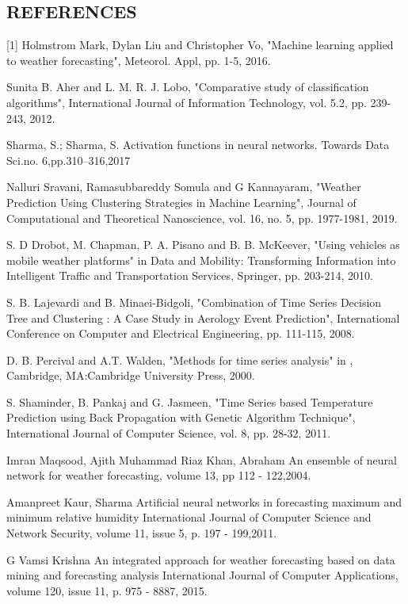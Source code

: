 \begin{}
    \section*{\centering REFERENCES}
    [1] Holmstrom Mark, Dylan Liu and Christopher Vo, "Machine learning applied to weather forecasting", Meteorol. Appl, pp. 1-5, 2016.


\noindent[2] Sunita B. Aher and L. M. R. J. Lobo, "Comparative study of classification algorithms", International Journal of Information Technology, vol. 5.2, pp. 239-243, 2012.

\noindent[3] Sharma, S.; Sharma, S. Activation functions in neural networks. Towards Data Sci.no. 6,pp.310–316,2017


\noindent[4] Nalluri Sravani, Ramasubbareddy Somula and G Kannayaram, "Weather Prediction Using Clustering Strategies in Machine Learning", Journal of Computational and Theoretical Nanoscience, vol. 16, no. 5, pp. 1977-1981, 2019.

\noindent[5] S. D Drobot, M. Chapman, P. A. Pisano and B. B. McKeever, "Using vehicles as mobile weather platforms" in Data and Mobility: Transforming Information into Intelligent Traffic and Transportation Services, Springer, pp. 203-214, 2010.

\noindent [6]S. B. Lajevardi and B. Minaei-Bidgoli, "Combination of Time Series Decision Tree and Clustering : A Case Study in Aerology Event Prediction", International Conference on Computer and Electrical Engineering, pp. 111-115, 2008.

\noindent[7] D. B. Percival and A.T. Walden, "Methods for time series analysis" in , Cambridge, MA:Cambridge University Press, 2000.

\noindent[8] S. Shaminder, B. Pankaj and G. Jasmeen, "Time Series based Temperature Prediction using Back Propagation with Genetic Algorithm Technique", International Journal of Computer Science, vol. 8, pp. 28-32, 2011.

\noindent[9]   Imran Maqsood, Ajith Muhammad Riaz Khan, Abraham
An ensemble of neural network for weather forecasting, volume 13, pp 112 - 122,2004.

\noindent[10] Amanpreet Kaur, Sharma
Artificial neural networks in forecasting maximum and minimum relative humidity
International Journal of Computer Science and Network Security, volume 11, issue 5, p. 197 - 199,2011.

\noindent[11] G Vamsi Krishna
An integrated approach for weather forecasting based on data mining and forecasting analysis
International Journal of Computer Applications, volume 120, issue 11, p. 975 - 8887, 2015.


\end{}
